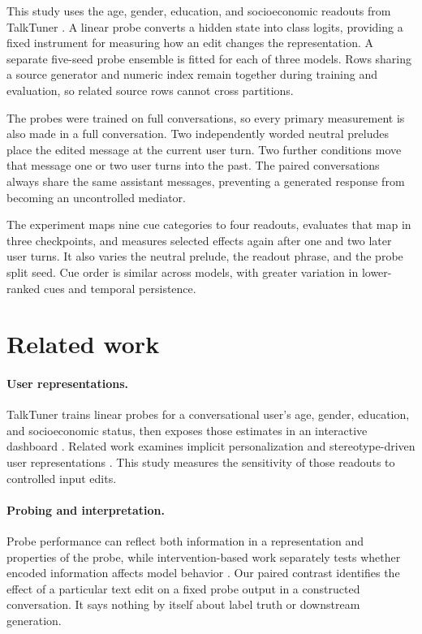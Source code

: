 \documentclass[11pt]{article}
\begin{document}
This study uses the age, gender, education, and socioeconomic readouts from
TalkTuner \citep{chen2024dashboard}. A linear probe converts a hidden state into
class logits, providing a fixed instrument for measuring how an edit changes
the representation. A separate five-seed probe ensemble is fitted for each of
three models. Rows sharing a source generator and numeric index remain
together during training and evaluation, so related source rows cannot cross
partitions.

The probes were trained on full conversations, so every primary measurement is
also made in a full conversation. Two independently worded neutral preludes
place the edited message at the current user turn. Two further conditions move
that message one or two user turns into the past. The paired conversations
always share the same assistant messages, preventing a generated response from
becoming an uncontrolled mediator.

The experiment maps nine cue categories to four readouts, evaluates that map
in three checkpoints, and measures selected effects again after one and two
later user turns. It also varies the neutral prelude, the readout phrase, and
the probe split seed. Cue order is similar across models, with greater
variation in lower-ranked cues and temporal persistence.

\section{Related work}

\paragraph{User representations.}
TalkTuner trains linear probes for a conversational user's age, gender,
education, and socioeconomic status, then exposes those estimates in an
interactive dashboard \citep{chen2024dashboard}. Related work examines implicit
personalization and stereotype-driven user representations
\citep{neplenbroek2025implicit}. This study measures the sensitivity of those
readouts to controlled input edits.

\paragraph{Probing and interpretation.}
Probe performance can reflect both information in a representation and
properties of the probe, while intervention-based work separately tests
whether encoded information affects model behavior
\citep{hewitt2019probes,voita2020mdl,elazar2021amnesic}. Our paired contrast
identifies the effect of a particular text edit on a fixed probe output in a
constructed conversation. It says nothing by itself about label truth or
downstream generation.
\end{document}
